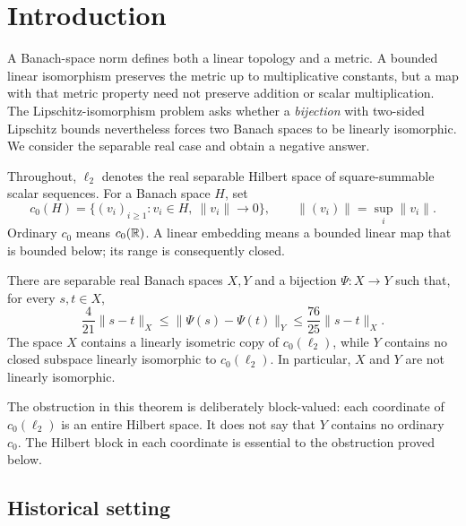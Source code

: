 \section{Introduction}
\label{sec:introduction}

A Banach-space norm defines both a linear topology and a metric.
A bounded linear isomorphism preserves the metric up to multiplicative
constants, but a map with that metric property need not preserve
addition or scalar multiplication. The Lipschitz-isomorphism problem
asks whether a \emph{bijection} with two-sided Lipschitz bounds nevertheless
forces two Banach spaces to be linearly isomorphic. We consider the
separable real case and obtain a negative answer.

Throughout, \(\ell_2\) denotes the real separable Hilbert space of
square-summable scalar sequences. For a Banach space \(H\), set
\[
 c_0(H)=\{(v_i)_{i\ge1}:v_i\in H,\ \|v_i\|\longrightarrow0\},
 \qquad \|(v_i)\|=\sup_i\|v_i\|.
\]
Ordinary \(c_0\) means \(c_0(\mathbb R)\). A linear embedding means a bounded
linear map that is bounded below; its range is consequently closed.

\begin{theorem}
\label{thm:main}
There are separable real Banach spaces \(X,Y\) and a bijection
\(\Psi:X\to Y\) such that, for every \(s,t\in X\),
\begin{equation}
\label{eq:main-bounds}
 \frac4{21}\|s-t\|_X
 \le \|\Psi(s)-\Psi(t)\|_Y
 \le \frac{76}{25}\|s-t\|_X.
\end{equation}
The space \(X\) contains a linearly isometric copy of \(c_0(\ell_2)\), while
\(Y\) contains no closed subspace linearly isomorphic to
\(c_0(\ell_2)\). In particular, \(X\) and \(Y\) are not linearly
isomorphic.
\end{theorem}

The obstruction in this theorem is deliberately block-valued:
each coordinate of \(c_0(\ell_2)\) is an entire Hilbert space.
It does not say that \(Y\) contains no ordinary \(c_0\).
The Hilbert block in each coordinate is essential to the obstruction
proved below.

\subsection*{Historical setting}

